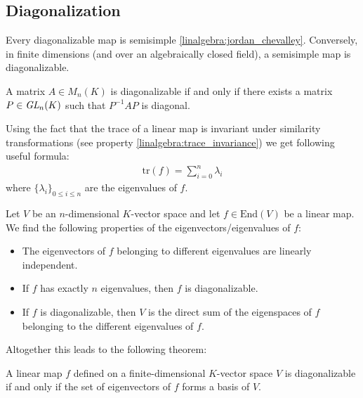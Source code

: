 \subsection{Diagonalization}

    \begin{property}
        Every diagonalizable map is semisimple \ref{linalgebra:jordan_chevalley}. Conversely, in finite dimensions (and over an algebraically closed field), a semisimple map is diagonalizable.
    \end{property}

    \begin{theorem}\label{linalgebra:theorem:diagonalizable_PQP}
        A matrix $A\in M_n(K)$ is diagonalizable if and only if there exists a matrix $P\in\emph{GL}_n(K)$ such that $P^{-1}AP$ is diagonal.
    \end{theorem}
    \begin{result}
        Using the fact that the trace of a linear map is invariant under similarity transformations (see property \ref{linalgebra:trace_invariance}) we get following useful formula:
        \begin{gather}
            \text{tr}(f) = \sum_{i=0}^n\lambda_i
        \end{gather}
        where $\{\lambda_i\}_{0\leq i\leq n}$ are the eigenvalues of $f$.
    \end{result}

    \begin{property}\label{linalgebra:diagonalization_properties}
        Let $V$ be an $n$-dimensional $K$-vector space and let $f\in\text{End}(V)$ be a linear map. We find the following properties of the eigenvectors/eigenvalues of $f$:
        \begin{itemize}
            \item The eigenvectors of $f$ belonging to different eigenvalues are linearly independent.
            \item If $f$ has exactly $n$ eigenvalues, then $f$ is diagonalizable.
            \item If $f$ is diagonalizable, then $V$ is the direct sum of the eigenspaces of $f$ belonging to the different eigenvalues of $f$.
        \end{itemize}
    \end{property}
    Altogether this leads to the following theorem:
    \begin{theorem}\label{linalgebra:theorem:diagonalizable_basis}
        A linear map $f$ defined on a finite-dimensional $K$-vector space $V$ is diagonalizable if and only if the set of eigenvectors of $f$ forms a basis of $V$.
    \end{theorem}

